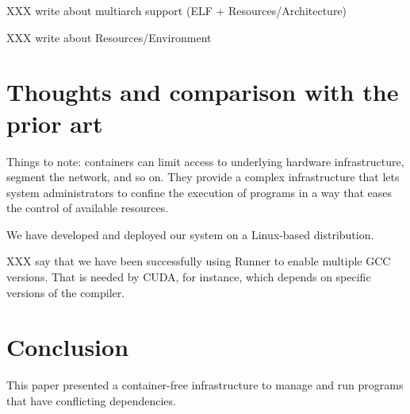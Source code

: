 \documentclass[sigplan, anonymous, 10pt]{acmart}
\begin{document}
XXX write about multiarch support (ELF + Resources/Architecture)
\lipsum[7]

XXX write about Resources/Environment
\lipsum[8]

\section{Thoughts and comparison with the prior art}
Things to note: containers can limit access to underlying hardware infrastructure, segment the
network, and so on. They provide a complex infrastructure that lets system administrators to
confine the execution of programs in a way that eases the control of available resources.

We have developed and deployed our system on a Linux-based distribution.

XXX say that we have been successfully using Runner to enable multiple GCC versions.
That is needed by CUDA, for instance, which depends on specific versions of the compiler.

\lipsum[9-13]

\section{Conclusion}
This paper presented a container-free infrastructure to manage and run programs that have
conflicting dependencies. 

\lipsum[14-16]



\end{document}
